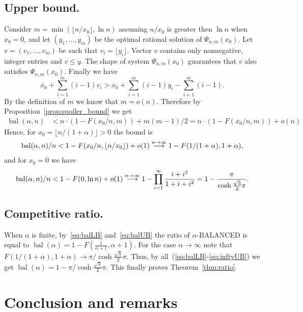 \documentclass[12pt]{amsart}
\renewcommand{\leq}{\leqslant}
\theoremstyle{definition}
\newcommand{\Alg}[0]{\textsf{BALANCED}\xspace}
\DeclareMathOperator{\bal}{bal}
\begin{document}
\subsection{Upper bound.}
Consider $m=\min(\lfloor n/x_0 \rfloor,\ln n )$ assuming $n/x_0$ is greater then $\ln n$ when $x_0=0$,
and let $(y_1, \ldots, y_m)$ be the optimal rational solution of $\Psi_{n,m}(x_0)$.
Let $v=(v_1, \ldots, v_m)$ be such that $v_i= \lfloor y_i \rfloor$.
Vector $v$ contains only nonnegative, integer entries and $v\leq y$. 
The shape of system $\Psi_{n,m}(x_0)$ guarantees that $v$ also satisfies $\Psi_{n,m}(x_0)$.
Finally we have
\[
	x_0 + \sum_{i=1}^m (i-1) v_i >  x_0 + \sum_{i=1}^m (i-1) y_i - \sum_{i=1}^{m} (i-1).
\]
By the definition of $m$ we know that $m = o(n)$.
Therefore by Proposition~\ref{prop:spoiler_bound} we get
\begin{align*}
	\bal(\alpha,n) &< n \cdot (1-F(x_0/n,m )) + m(m-1)/2
	                =n \cdot (1-F(x_0/n,m )) + o(n)
\end{align*}
Hence, for $x_0=\lfloor n / (1+\alpha) \rfloor > 0$ the bound is
\begin{align}\label{eq:balUB}
 \bal(\alpha,n)/n  < 1-F(x_0/n,\lfloor n/x_0 \rfloor ) + o(1) \buildrel n\to\infty\over\longrightarrow 1 - F(1/(1+\alpha),1+\alpha),
\end{align}
and for $x_0 = 0$ we have
\begin{align}\label{eq:inftyUB}
 \bal(\alpha,n)/n < 1 - F(0,\ln n) + o(1) \buildrel n\to\infty\over\longrightarrow 1-\prod_{i=1}^{\infty}\frac{i+i^2}{1+i+i^2} =
  1-\frac{\pi}{\cosh\tfrac{\sqrt{3}}{2}\pi}.
\end{align}


\subsection{Competitive ratio.}
When $\alpha$ is finite, by~\eqref{eq:balLB} and~\eqref{eq:balUB} the ratio of $\alpha$-\Alg{} is equal to  $\bal(\alpha)= 1 - F(\frac{1}{\alpha+1},\alpha + 1)$.
For the case $\alpha\to\infty$ note that $F(1/(1+\alpha),1+\alpha)\to {\pi}/{\cosh\tfrac{\sqrt{3}}{2}\pi}$.
Thus, by all~(\ref{eq:balLB}-\ref{eq:inftyUB}) we get $\bal(\alpha) = 1-{\pi}/{\cosh\tfrac{\sqrt{3}}{2}\pi}$.
This finally proves Theorem~\ref{thm:ratio}.


\section{Conclusion and remarks}\label{sec:remarks}
\end{document}
